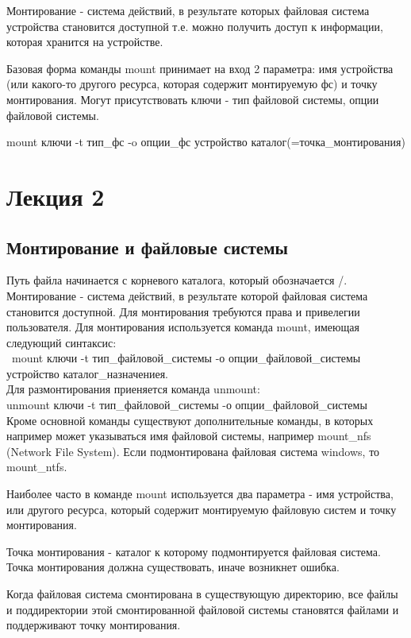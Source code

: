 Монтирование - система действий, в результате которых файловая система устройства становится доступной т.е. можно получить доступ к информации, которая хранится на устройстве.

Базовая форма команды mount принимает на вход 2 параметра: имя устройства (или какого-то другого ресурса, которая содержит монтируемую фс) и точку монтирования. Могут присутствовать ключи - тип файловой системы, опции файловой системы.

mount ключи -t тип\_фс -o опции\_фс устройство каталог(=точка\_монтирования)

\chapter{Лекция 2}
\section{Монтирование и файловые системы}
Путь файла начинается с корневого каталога, который обозначается /. Монтирование - система действий, в результате которой файловая система становится доступной. Для монтирования требуются права и привелегии пользователя. Для монтирования используется команда mount, имеющая следующий синтаксис:\\\
mount ключи -t тип\_файловой\_системы -о опции\_файловой\_системы устройство каталог\_назначениея.\\

Для размонтирования приеняется команда unmount:\\
unmount ключи -t тип\_файловой\_системы -о опции\_файловой\_системы\\

Кроме основной команды существуют дополнительные команды, в которых например может указываться имя файловой системы, например mount\_nfs (Network File System). Если подмонтирована файловая система windows, то mount\_ntfs.

Наиболее часто в команде mount используется два параметра - имя устройства, или другого ресурса, который содержит монтируемую файловую систем и точку монтирования. 

Точка монтирования - каталог к которому подмонтируется файловая система. Точка монтирования должна существовать, иначе возникнет ошибка. 

Когда файловая система смонтирована в существующую директорию, все файлы и поддиректории этой смонтированной файловой системы становятся файлами и поддерживают точку монтирования. 

